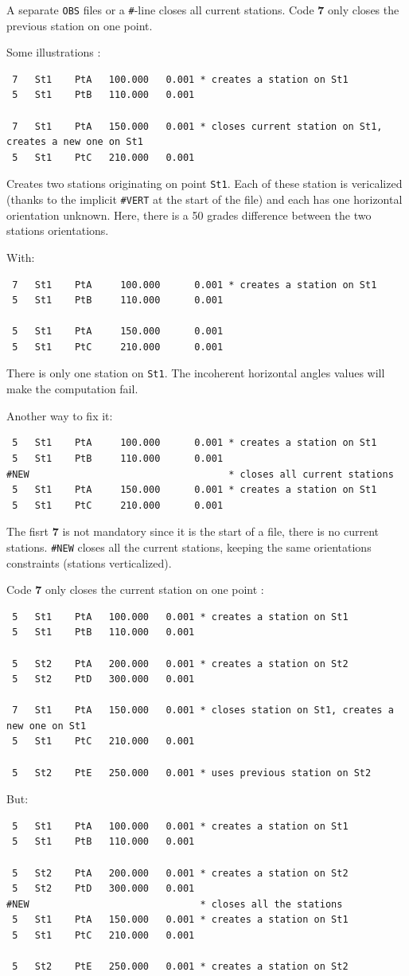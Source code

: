 A separate \texttt{OBS} files or a \texttt{\#}-line closes all current stations.
Code \textbf{7} only closes the previous station on one point. 

Some illustrations :
\begin{verbatim}
 7   St1    PtA   100.000   0.001 * creates a station on St1
 5   St1    PtB   110.000   0.001

 7   St1    PtA   150.000   0.001 * closes current station on St1, creates a new one on St1
 5   St1    PtC   210.000   0.001
\end{verbatim}
Creates two stations originating on point \texttt{St1}. Each of these station
is vericalized (thanks to the implicit \texttt{\#VERT} at the start of the file) and each has one horizontal orientation unknown.
Here, there is a 50 grades difference between the two stations orientations.

With:
\begin{verbatim}
 7   St1    PtA     100.000      0.001 * creates a station on St1
 5   St1    PtB     110.000      0.001

 5   St1    PtA     150.000      0.001
 5   St1    PtC     210.000      0.001
\end{verbatim}
There is only one station on \texttt{St1}. The incoherent horizontal angles values
will make the computation fail.

Another way to fix it:
\begin{verbatim}
 5   St1    PtA     100.000      0.001 * creates a station on St1
 5   St1    PtB     110.000      0.001
#NEW                                   * closes all current stations
 5   St1    PtA     150.000      0.001 * creates a station on St1
 5   St1    PtC     210.000      0.001
\end{verbatim}
The fisrt \textbf{7} is not mandatory since it is the start of a file, there is no
current stations. \texttt{\#NEW} closes all the current stations, keeping the same orientations constraints (stations verticalized).

Code \textbf{7} only closes the current station on one point :
\begin{verbatim}
 5   St1    PtA   100.000   0.001 * creates a station on St1
 5   St1    PtB   110.000   0.001
 
 5   St2    PtA   200.000   0.001 * creates a station on St2
 5   St2    PtD   300.000   0.001

 7   St1    PtA   150.000   0.001 * closes station on St1, creates a new one on St1
 5   St1    PtC   210.000   0.001

 5   St2    PtE   250.000   0.001 * uses previous station on St2
\end{verbatim}
But:
\begin{verbatim}
 5   St1    PtA   100.000   0.001 * creates a station on St1
 5   St1    PtB   110.000   0.001
 
 5   St2    PtA   200.000   0.001 * creates a station on St2
 5   St2    PtD   300.000   0.001
#NEW                              * closes all the stations
 5   St1    PtA   150.000   0.001 * creates a station on St1
 5   St1    PtC   210.000   0.001

 5   St2    PtE   250.000   0.001 * creates a station on St2
\end{verbatim}



